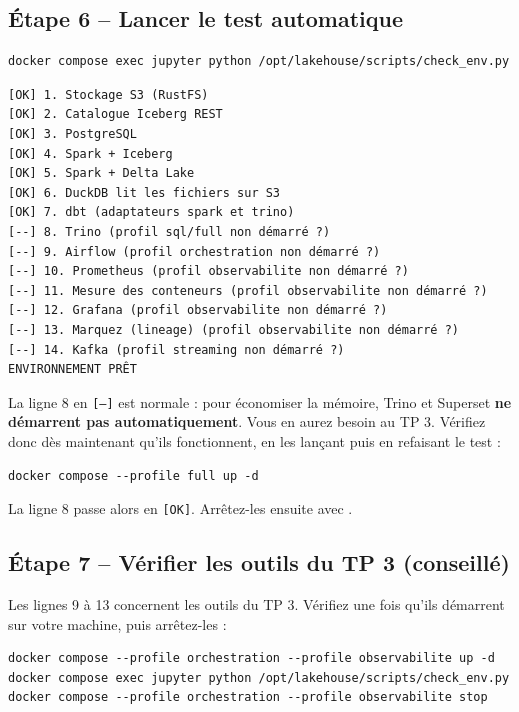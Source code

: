 \subsection*{Étape 6 -- Lancer le test automatique}
\begin{lstlisting}[style=shell]
docker compose exec jupyter python /opt/lakehouse/scripts/check_env.py
\end{lstlisting}

\begin{resultat}
\begin{lstlisting}[basicstyle=\ttfamily\footnotesize,backgroundcolor=\color{white},frame=none]
[OK] 1. Stockage S3 (RustFS)
[OK] 2. Catalogue Iceberg REST
[OK] 3. PostgreSQL
[OK] 4. Spark + Iceberg
[OK] 5. Spark + Delta Lake
[OK] 6. DuckDB lit les fichiers sur S3
[OK] 7. dbt (adaptateurs spark et trino)
[--] 8. Trino (profil sql/full non démarré ?)
[--] 9. Airflow (profil orchestration non démarré ?)
[--] 10. Prometheus (profil observabilite non démarré ?)
[--] 11. Mesure des conteneurs (profil observabilite non démarré ?)
[--] 12. Grafana (profil observabilite non démarré ?)
[--] 13. Marquez (lineage) (profil observabilite non démarré ?)
[--] 14. Kafka (profil streaming non démarré ?)
ENVIRONNEMENT PRÊT
\end{lstlisting}
La ligne 8 en \texttt{[--]} est normale : pour économiser la mémoire, Trino et Superset
\textbf{ne démarrent pas automatiquement}. Vous en aurez besoin au TP 3. Vérifiez donc dès
maintenant qu'ils fonctionnent, en les lançant puis en refaisant le test :
\begin{lstlisting}[style=shell]
docker compose --profile full up -d
\end{lstlisting}
La ligne 8 passe alors en \texttt{[OK]}. Arrêtez-les ensuite avec
.
\end{resultat}

\subsection*{Étape 7 -- Vérifier les outils du TP 3 (conseillé)}
Les lignes 9 à 13 concernent les outils du TP 3. Vérifiez une fois qu'ils démarrent sur votre
machine, puis arrêtez-les :
\begin{lstlisting}[style=shell]
docker compose --profile orchestration --profile observabilite up -d
docker compose exec jupyter python /opt/lakehouse/scripts/check_env.py
docker compose --profile orchestration --profile observabilite stop
\end{lstlisting}

